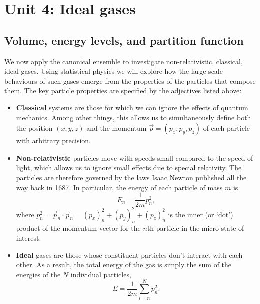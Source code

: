 \renewcommand{\thisunit}{MATH327 Unit 4}
\renewcommand{\moddate}{Last modified 27 Feb.~2023}
\setcounter{section}{4}
\setcounter{subsection}{0}
{}
\section*{Unit 4: Ideal gases}
\subsection{\label{sec:regulate}Volume, energy levels, and partition function}
We now apply the canonical ensemble to investigate non-relativistic, classical, ideal gases.
Using statistical physics we will explore how the large-scale behaviours of such gases emerge from the properties of the particles that compose them.
The key particle properties are specified by the adjectives listed above: \\[-24 pt]
\begin{itemize}
  \item \textbf{Classical} systems are those for which we can ignore the effects of quantum mechanics.
        Among other things, this allows us to simultaneously define both the position $(x, y, z)$ and the momentum $\vec p = (p_x, p_y, p_z)$ of each particle with arbitrary precision. %
  \item \textbf{Non-relativistic} particles move with speeds small compared to the speed of light, which allows us to ignore small effects due to special relativity.
        The particles are therefore governed by the laws Isaac Newton published all the way back in 1687.
        In particular, the energy of each particle of mass $m$ is
        \begin{equation*}
          E_n = \frac{1}{2m} p_n^2,
        \end{equation*}
        where $p_n^2 = \vec p_n \cdot \vec p_n = (p_x)_n^2 + (p_y)_n^2 + (p_z)_n^2$ is the inner (or `dot') product of the momentum vector for the $n$th particle in the micro-state of interest.
  \item \textbf{Ideal} gases are those whose constituent particles don't interact with each other.
        As a result, the total energy of the gas is simply the sum of the energies of the $N$ individual particles,
        \begin{equation}
          \label{eq:momentum}
          E = \frac{1}{2m} \sum_{i = n}^N p_n^2.
        \end{equation}
\end{itemize}


